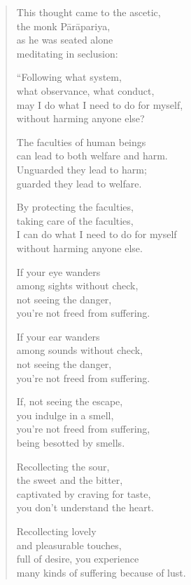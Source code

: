 \documentclass[12pt,openany]{book}%
\begin{document}
\begin{verse}%
This thought came to the ascetic, \\
the monk \textsanskrit{Pārāpariya}, \\
as he was seated alone \\
meditating in seclusion: 

“Following what system, \\
what observance, what conduct, \\
may I do what I need to do for myself, \\
without harming anyone else? 

The faculties of human beings \\
can lead to both welfare and harm. \\
Unguarded they lead to harm; \\
guarded they lead to welfare. 

By protecting the faculties, \\
taking care of the faculties, \\
I can do what I need to do for myself \\
without harming anyone else. 

If your eye wanders \\
among sights without check, \\
not seeing the danger, \\
you’re not freed from suffering. 

If your ear wanders \\
among sounds without check, \\
not seeing the danger, \\
you’re not freed from suffering. 

If, not seeing the escape, \\
you indulge in a smell, \\
you’re not freed from suffering, \\
being besotted by smells. 

Recollecting the sour, \\
the sweet and the bitter, \\
captivated by craving for taste, \\
you don’t understand the heart. 

Recollecting lovely \\
and pleasurable touches, \\
full of desire, you experience \\
many kinds of suffering because of lust. 


\end{verse}
\end{document}
